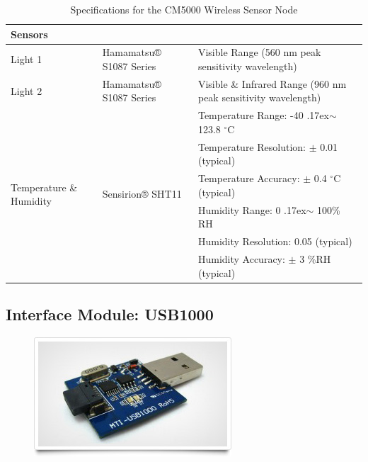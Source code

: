 \documentclass[a4paper]{article}
\newcommand{\mytilde}{\raise.17ex\hbox{$\scriptstyle\mathtt{\sim}$} }
\begin{document}
\begin{table}[H]
\begin{tabular}{| l | l | l |}
	\multicolumn{3}{|l|}{\textbf{Sensors}} \\
	\hline
	Light 1 & Hamamatsu® S1087 Series & Visible Range (560 nm peak sensitivity wavelength)\\
	\hline
	Light 2 & Hamamatsu® S1087 Series & Visible \& Infrared Range (960 nm peak sensitivity wavelength)\\
	\hline
	\multirow{6}{*}{Temperature \& Humidity} &  \multirow{6}{*}{Sensirion® SHT11} & Temperature Range: -40 \mytilde 123.8 $^\circ$C  \\
	~ & ~ & Temperature Resolution: $\pm$ 0.01 (typical) \\
	~ & ~ & Temperature Accuracy: $\pm$ 0.4 $^\circ$C (typical) \\
	~ & ~ & Humidity Range: 0 \mytilde 100\% RH \\
	~ & ~ & Humidity Resolution: 0.05 (typical) \\
	~ & ~ & Humidity Accuracy: $\pm$ 3 \%RH (typical) \\
	\hline

	\end{tabular}
	\caption{Specifications for the CM5000 Wireless Sensor Node \cite{CM5000}}
	\label{tab:CM5000-spec}
\end{table}

\clearpage


\subsection{Interface Module: USB1000}

\begin{figure}[H]
\centering
\includegraphics[scale=0.5]{Images/USB1000}
\end{figure}
\end{document}
